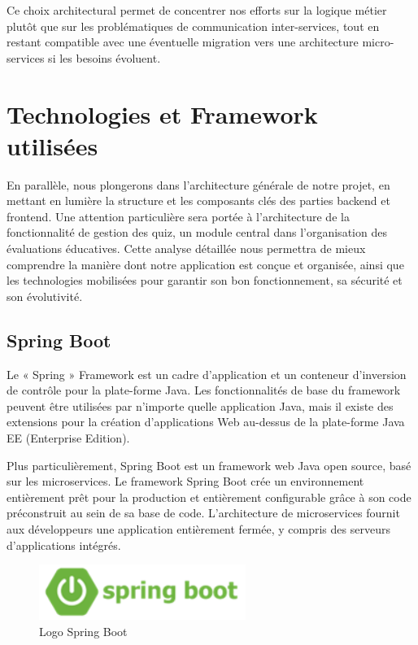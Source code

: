 \documentclass[12pt,a4paper]{report}
\begin{document}
Ce choix architectural permet de concentrer nos efforts sur la logique métier plutôt que sur les problématiques de communication inter-services, tout en restant compatible avec une éventuelle migration vers une architecture micro-services si les besoins évoluent.

\section{Technologies et Framework utilisées}

En parallèle, nous plongerons dans l'architecture générale de notre projet, en mettant en lumière la structure et les composants clés des parties backend et frontend. Une attention particulière sera portée à l'architecture de la fonctionnalité de gestion des quiz, un module central dans l'organisation des évaluations éducatives. Cette analyse détaillée nous permettra de mieux comprendre la manière dont notre application est conçue et organisée, ainsi que les technologies mobilisées pour garantir son bon fonctionnement, sa sécurité et son évolutivité.

\subsection{Spring Boot}

Le « Spring » Framework est un cadre d'application et un conteneur d'inversion de contrôle pour la plate-forme Java. Les fonctionnalités de base du framework peuvent être utilisées par n'importe quelle application Java, mais il existe des extensions pour la création d'applications Web au-dessus de la plate-forme Java EE (Enterprise Edition).

Plus particulièrement, Spring Boot est un framework web Java open source, basé sur les microservices. Le framework Spring Boot crée un environnement entièrement prêt pour la production et entièrement configurable grâce à son code préconstruit au sein de sa base de code. L'architecture de microservices fournit aux développeurs une application entièrement fermée, y compris des serveurs d'applications intégrés.

\begin{figure}[H]
\centering
\includegraphics[width=0.6\textwidth]{latex_media/media/image23.png}
\caption{Logo Spring Boot}
\label{fig:logo-spring-boot}
\end{figure}
\end{document}
